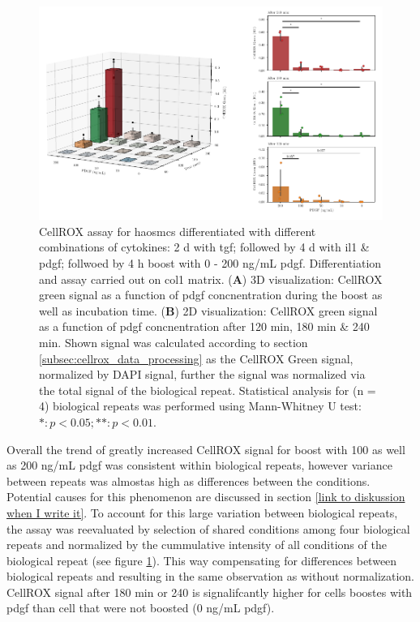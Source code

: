     \begin{figure}[h!]
    \capstart
        \centering
    	\includegraphics{Abbildung/CellROX_titration_norm.pdf}
    	\begin{minipage}{\captionwidth}
    		\caption[cellROX_titration_norm]{ \newline
            CellROX assay for \acp{haosmc} differentiated with different combinations of cytokines: 2 d with \ac{tgf}; followed by 4 d with \ac{il1} \& \ac{pdgf}; follwoed by 4 h boost with 0 - 200 ng/mL \ac{pdgf}. Differentiation and assay carried out on \ac{col1} matrix.
            (\textbf{A}) 3D visualization: CellROX green signal as a function of \ac{pdgf} concnentration during the boost as well as incubation time.
            (\textbf{B}) 2D visualization: CellROX green signal as a function of \ac{pdgf} concnentration after 120 min, 180 min \& 240 min.
            Shown signal was calculated according to section \ref{subsec:cellrox_data_processing} as the CellROX Green signal, normalized by DAPI signal, further the signal was normalized via the total signal of the biological repeat. Statistical analysis for (n = 4) biological repeats was performed using Mann-Whitney U test: $*: p < 0.05; **: p < 0.01$.}
    		\label{fig:cellROX_titration_norm}
    	\end{minipage}
    \end{figure}

    Overall the trend of greatly increased CellROX signal for boost with 100 as well as 200 ng/mL \ac{pdgf} was consistent within biological repeats, however variance between repeats was almostas high as differences between the conditions. Potential causes for this phenomenon are discussed in section \ref{link to diskussion when I write it}. To account for this large variation between biological repeats, the assay was reevaluated by selection of shared conditions among four biological repeats and normalized by the cummulative intensity of all conditions of the biological repeat (see figure \ref{fig:cellROX_titration_norm}). This way compensating for differences between biological repeats and resulting in the same observation as without normalization. CellROX signal after 180 min or 240 is signalifcantly higher for cells boostes with \ac{pdgf} than cell that were not boosted (0 ng/mL \ac{pdgf}).

